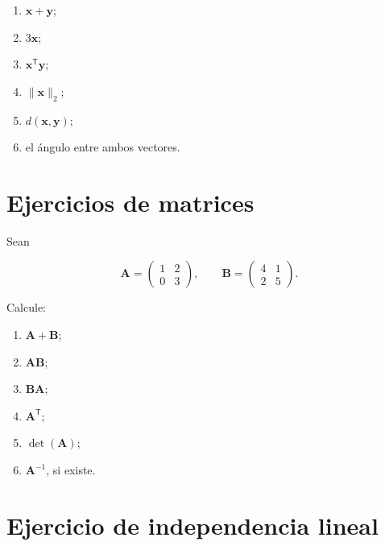 \documentclass[
  spanish,
  10.5pt,
  letterpaper,
  DIV=11,
  numbers=noendperiod,
  oneside,
  open=any]{scrreprt}
\providecommand{\tightlist}{%
  \setlength{\itemsep}{0pt}\setlength{\parskip}{0pt}}
\theoremstyle{definition}
\theoremstyle{definition}
\theoremstyle{plain}
\theoremstyle{remark}
\begin{document}
\begin{enumerate}
\def\labelenumi{\arabic{enumi}.}
\tightlist
\item
  \(\mathbf{x}+\mathbf{y}\);
\item
  \(3\mathbf{x}\);
\item
  \(\mathbf{x}^{\mathsf T}\mathbf{y}\);
\item
  \(\|\mathbf{x}\|_2\);
\item
  \(d(\mathbf{x},\mathbf{y})\);
\item
  el ángulo entre ambos vectores.
\end{enumerate}

\section*{Ejercicios de matrices}\label{ejercicios-de-matrices}


Sean

\[
\mathbf{A}
=
\begin{pmatrix}
1 & 2\\
0 & 3
\end{pmatrix},
\qquad
\mathbf{B}
=
\begin{pmatrix}
4 & 1\\
2 & 5
\end{pmatrix}.
\]

Calcule:

\begin{enumerate}
\def\labelenumi{\arabic{enumi}.}
\tightlist
\item
  \(\mathbf{A}+\mathbf{B}\);
\item
  \(\mathbf{A}\mathbf{B}\);
\item
  \(\mathbf{B}\mathbf{A}\);
\item
  \(\mathbf{A}^{\mathsf T}\);
\item
  \(\det(\mathbf{A})\);
\item
  \(\mathbf{A}^{-1}\), si existe.
\end{enumerate}

\section*{Ejercicio de independencia
lineal}\label{ejercicio-de-independencia-lineal}

\end{document}
